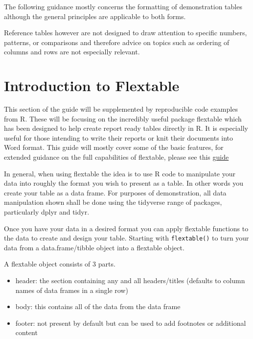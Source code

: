 \documentclass[
]{book}
\providecommand{\tightlist}{%
  \setlength{\itemsep}{0pt}\setlength{\parskip}{0pt}}
\begin{document}
The following guidance mostly concerns the formatting of demonstration tables although the general principles are applicable to both forms.

Reference tables however are not designed to draw attention to specific numbers, patterns, or comparisons and therefore advice on topics such as ordering of columns and rows are not especially relevant.

\hypertarget{introduction-to-flextable}{%
\section{Introduction to Flextable}\label{introduction-to-flextable}}

This section of the guide will be supplemented by reproducible code examples from R. These will be focusing on the incredibly useful package flextable which has been designed to help create report ready tables directly in R. It is especially useful for those intending to write their reports or knit their documents into Word format. This guide will mostly cover some of the basic features, for extended guidance on the full capabilities of flextable, please see this \href{https://ardata-fr.github.io/flextable-book/}{guide}

In general, when using flextable the idea is to use R code to manipulate your data into roughly the format you wish to present as a table. In other words you create your table as a data frame. For purposes of demonstration, all data manipulation shown shall be done using the tidyverse range of packages, particularly dplyr and tidyr.

Once you have your data in a desired format you can apply flextable functions to the data to create and design your table. Starting with \texttt{flextable()} to turn your data from a data.frame/tibble object into a flextable object.

A flextable object consists of 3 parts.

\begin{itemize}
\tightlist
\item
  header: the section containing any and all headers/titles (defaults to column names of data frames in a single row)
\item
  body: this contains all of the data from the data frame
\item
  footer: not present by default but can be used to add footnotes or additional content
\end{itemize}
\end{document}

